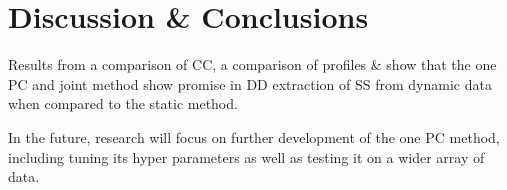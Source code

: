 \section{Discussion \& Conclusions} \label{sec:discussion_and_conclusions}
    Results from a comparison of \gls{CC}, a comparison of profiles \&  show that the one \gls{PC} and joint method show promise in \gls{DD} extraction of \gls{SS} from dynamic data when compared to the static method.
    
    In the future, research will focus on further development of the one \gls{PC} method, including tuning its hyper parameters as well as testing it on a wider array of data.
